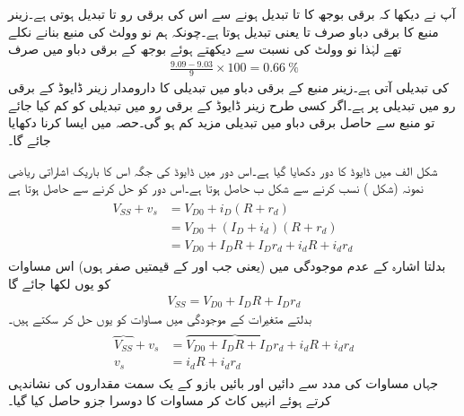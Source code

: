 آپ نے دیکھا کہ برقی بوجھ کا  تا  تبدیل ہونے سے اس کی برقی رو  تا   تبدیل ہوتی ہے۔زینر منبع کا برقی دباو صرف  تا  یعنی  تبدیل ہوتا ہے۔چونکہ ہم نو وولٹ کی منبع بنانے نکلے تھے لہٰذا نو وولٹ کی نسبت سے دیکھتے ہوئے بوجھ کے برقی دباو  میں صرف
\begin{align*}
\frac{9.09-9.03}{9} \times 100=\SI{0.66}{\percent}
\end{align*}
کی تبدیلی آتی ہے۔زینر منبع کے برقی دباو میں تبدیلی کا دارومدار زینر ڈایوڈ کے برقی رو میں تبدیلی پر ہے۔اگر کسی طرح زینر ڈایوڈ کے برقی رو میں تبدیلی کو کم کیا جائے تو منبع سے حاصل برقی دباو میں تبدیلی مزید کم ہو گی۔حصہ  میں ایسا کرنا دکھایا جائے گا۔

شکل  الف میں ڈایوڈ کا دور دکھایا گیا ہے۔اس دور میں ڈایوڈ کی جگہ اس کا باریک اشاراتی ریاضی نمونہ (شکل 
  ) نسب کرنے سے شکل  ب حاصل ہوتا ہے۔اس دور کو حل کرنے سے حاصل ہوتا ہے
\begin{gather} \label{مساوات_ڈایوڈ_اشارہ_موجود}
\begin{aligned}
V_{SS}+v_s&=V_{D0}+i_D (R+r_d )\\
&=V_{D0}+(I_D+i_d)(R+r_d)\\
&=V_{D0}+I_D R + I_D r_d + i_d R + i_d r_d\
\end{aligned}
\end{gather}
بدلتا اشارہ کے عدم موجودگی میں (یعنی جب   اور  کے قیمتیں صفر ہوں) اس مساوات کو یوں لکھا جائے گا
\begin{align} \label{مساوات_ڈایوڈ_اشارہ_عدم_موجود}
V_{SS}=V_{D0}+I_D R +I_D r_d
\end{align}
بدلتے متغیرات کے موجودگی میں مساوات   کو یوں حل کر سکتے ہیں۔
\begin{gather} \label{مساوات_ڈایوڈ_باریک_اشاراتی_مساوات}
\begin{aligned}
\overbrace{V_{SS}}+v_s &=\overbrace{V_{D0}+I_D R + I_D r_d}+i_d R + i_d r_d\\
v_s &= i_d R + i_d r_d
\end{aligned}
\end{gather}
جہاں مساوات   کی مدد سے دائیں اور بائیں بازو کے یک سمت مقداروں کی نشاندہی کرتے ہوئے انہیں کاٹ کر مساوات کا دوسرا جزو حاصل کیا گیا۔

